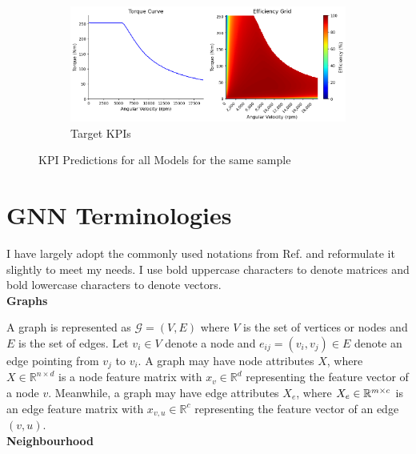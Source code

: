 \documentclass{report} %
\begin{document}
\begin{figure}[H]\ContinuedFloat
    \begin{subfigure}{1\textwidth}
        \centering
        \includegraphics[width=1\textwidth]{./ReportImages/predictions_groundtruth.png} 
        \caption{Target KPIs} 
        \label{Target KPIs}
    \end{subfigure}\hfill
    \caption{KPI Predictions for all Models for the same sample}
    \label{fig:KPI Predictions for all Models for the same sample}
\end{figure}

\section{GNN Terminologies}
\label{sec:GNN Terminologies}

I have largely adopt the commonly used notations from Ref. \cite{GNN-2019} and reformulate it slightly to meet my needs.
I use bold uppercase characters to denote matrices and bold lowercase characters to denote vectors.\\

\textbf{Graphs}

A graph is represented as \( \mathcal{G} = (V, E) \) where \( V \) is the set of vertices or nodes  and \( E \) is the set of edges. 
Let \( v_i \in V \) denote a node and \( e_{ij} = (v_i, v_j) \in E \) denote an edge pointing from \( v_j \) to \( v_i \).
A graph may have node attributes \( X \), where \( X \in \mathbb{R}^{n \times d} \) is a node feature matrix with 
\( x_v \in \mathbb{R}^d \) representing the feature vector of a node \( v \). 
Meanwhile, a graph may have edge attributes \( X_e \), where \( X_e \in \mathbb{R}^{m \times \\c} \) is an edge
feature matrix with \( x_{v,u} \in \mathbb{R}^c \) representing the feature vector of an edge \( (v, u) \).\\

\textbf{Neighbourhood}
\end{document}
